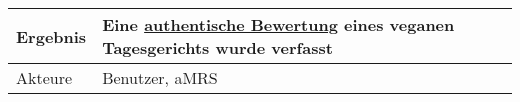 \begin{table}[H]
\begin{tabularx}{\textwidth}{| l | X |}
        \hline
        Ergebnis           & Eine \hyperref[gls:authentischeBewertung]{authentische Bewertung} eines veganen Tagesgerichts wurde verfasst                                                                                                                                                                                                                                                                                                                                                                                                                                                                                                                                              \\
        \hline
        Akteure            & Benutzer, \ac{aMRS}                                                                                                                                                                                                                                                                                                                                                                                                                                                                                                                                                                                                 \\
        \hline
    \end{tabularx}
\end{table}



